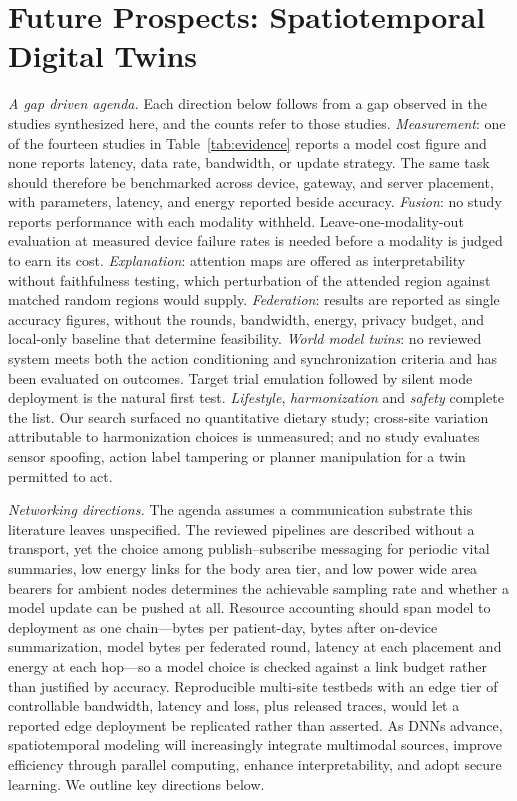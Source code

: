 \documentclass[journal]{IEEEtran}
\newif\ifsubmission
\begin{document}
\fi

\section{Future Prospects: Spatiotemporal Digital Twins}
\label{sec:future}
\ifsubmission
\emph{A gap driven agenda.} Each direction below follows from a gap observed in the studies synthesized here, and the counts refer to those studies. \emph{Measurement}: one of the fourteen studies in Table~\ref{tab:evidence} reports a model cost figure and none reports latency, data rate, bandwidth, or update strategy. The same task should therefore be benchmarked across device, gateway, and server placement, with parameters, latency, and energy reported beside accuracy. \emph{Fusion}: no study reports performance with each modality withheld. Leave-one-modality-out evaluation at measured device failure rates is needed before a modality is judged to earn its cost. \emph{Explanation}: attention maps are offered as interpretability without faithfulness testing, which perturbation of the attended region against matched random regions would supply. \emph{Federation}: results are reported as single accuracy figures, without the rounds, bandwidth, energy, privacy budget, and local-only baseline that determine feasibility. \emph{World model twins}: no reviewed system meets both the action conditioning and synchronization criteria and has been evaluated on outcomes. Target trial emulation followed by silent mode deployment is the natural first test. \emph{Lifestyle}, \emph{harmonization} and \emph{safety} complete the list. Our search surfaced no quantitative dietary study; cross-site variation attributable to harmonization choices is unmeasured; and no study evaluates sensor spoofing, action label tampering or planner manipulation for a twin permitted to act.

\emph{Networking directions.} The agenda assumes a communication substrate this literature leaves unspecified. The reviewed pipelines are described without a transport, yet the choice among publish--subscribe messaging for periodic vital summaries, low energy links for the body area tier, and low power wide area bearers for ambient nodes determines the achievable sampling rate and whether a model update can be pushed at all. Resource accounting should span model to deployment as one chain---bytes per patient-day, bytes after on-device summarization, model bytes per federated round, latency at each placement and energy at each hop---so a model choice is checked against a link budget rather than justified by accuracy. Reproducible multi-site testbeds with an edge tier of controllable bandwidth, latency and loss, plus released traces, would let a reported edge deployment be replicated rather than asserted.
\else
As DNNs advance, spatiotemporal modeling will increasingly integrate multimodal sources, improve efficiency through parallel computing, enhance interpretability, and adopt secure learning. We outline key directions below.
\end{document}
